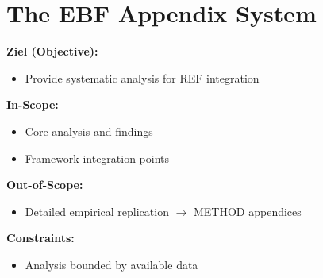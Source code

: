 %
%
%

\chapter{The EBF Appendix System}
\label{app:index}

\begin{abstract}
The EBF framework is supported by 166 appendices organized into 8 categories.
This index provides the naming convention, brief descriptions, and cross-reference
structure. Each appendix follows the format: \textbf{CATEGORY-NAME: Descriptive Title}.
\end{abstract}


\begin{tcolorbox}[
    colback=orange!5!white,
    colframe=orange!75!black,
    title={\textbf{Appendix Scope: Ziel / In-Scope / Out-of-Scope / Constraints}},
    fonttitle=\bfseries
]

\textbf{Ziel (Objective):}
\begin{itemize}[nosep]
    \item Provide systematic analysis for REF integration
\end{itemize}

\textbf{In-Scope:}
\begin{itemize}[nosep]
    \item Core analysis and findings
    \item Framework integration points
\end{itemize}

\textbf{Out-of-Scope:}
\begin{itemize}[nosep]
    \item Detailed empirical replication $\rightarrow$ METHOD appendices
\end{itemize}

\textbf{Constraints:}
\begin{itemize}[nosep]
    \item Analysis bounded by available data
\end{itemize}

\end{tcolorbox}

